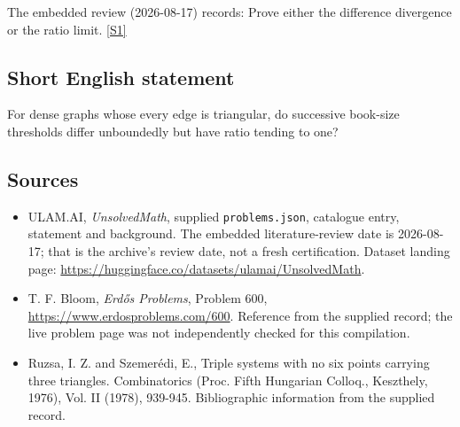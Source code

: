 \documentclass[11pt,a4paper]{article}
\newcommand{\sref}[2]{\hyperlink{source:#1:#2}{[S#2]}}
\begin{document}
The embedded review (2026-08-17) records: Prove either the difference divergence or the ratio limit. \sref{statement}{1}

\subsection{Short English statement}

For dense graphs whose every edge is triangular, do successive book-size thresholds differ unboundedly but have ratio tending to one?

\subsection{Sources}

{\small

\begin{itemize}

\item[\hypertarget{source:statement:1}{S1}] ULAM.AI, \emph{UnsolvedMath}, supplied \texttt{problems.json}, catalogue entry, statement and background. The embedded literature-review date is 2026-08-17; that is the archive’s review date, not a fresh certification. Dataset landing page: \url{https://huggingface.co/datasets/ulamai/UnsolvedMath}.

\item[\hypertarget{source:statement:2}{S2}] T. F. Bloom, \emph{Erdős Problems}, Problem 600, \url{https://www.erdosproblems.com/600}. Reference from the supplied record; the live problem page was not independently checked for this compilation.

\item[\hypertarget{source:statement:3}{S3}] Ruzsa, I. Z. and Szemer\'{e}di, E., Triple systems with no six points carrying three triangles. Combinatorics (Proc. Fifth Hungarian Colloq., Keszthely, 1976), Vol. II (1978), 939-945. Bibliographic information from the supplied record.

\end{itemize}

}

\label{end:statement}
\end{document}
